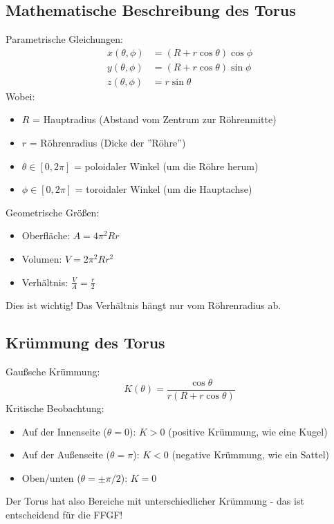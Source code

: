 \documentclass[12pt,a4paper]{article}
\begin{document}
	\subsection{Mathematische Beschreibung des Torus}
	Parametrische Gleichungen:
	\begin{align}
		x(\theta, \phi) &= (R + r \cos \theta) \cos \phi \\
		y(\theta, \phi) &= (R + r \cos \theta) \sin \phi \\
		z(\theta, \phi) &= r \sin \theta
	\end{align}
	Wobei:
	\begin{itemize}
		\item \( R \) = Hauptradius (Abstand vom Zentrum zur Röhrenmitte)
		\item \( r \) = Röhrenradius (Dicke der ''Röhre'')
		\item \( \theta \in [0, 2\pi] \) = poloidaler Winkel (um die Röhre herum)
		\item \( \phi \in [0, 2\pi] \) = toroidaler Winkel (um die Hauptachse)
	\end{itemize}
	
	Geometrische Größen:
	\begin{itemize}
		\item Oberfläche: \( A = 4\pi^2 R r \)
		\item Volumen: \( V = 2\pi^2 R r^2 \)
		\item Verhältnis: \( \frac{V}{A} = \frac{r}{2} \)
	\end{itemize}
	Dies ist wichtig! Das Verhältnis hängt nur vom Röhrenradius ab.
	
	\subsection{Krümmung des Torus}
	Gaußsche Krümmung:
	\[
	K(\theta) = \frac{\cos \theta}{r(R + r \cos \theta)}
	\]
	Kritische Beobachtung:
	\begin{itemize}
		\item Auf der Innenseite (\( \theta = 0 \)): \( K > 0 \) (positive Krümmung, wie eine Kugel)
		\item Auf der Außenseite (\( \theta = \pi \)): \( K < 0 \) (negative Krümmung, wie ein Sattel)
		\item Oben/unten (\( \theta = \pm\pi/2 \)): \( K = 0 \)
	\end{itemize}
	Der Torus hat also Bereiche mit unterschiedlicher Krümmung - das ist entscheidend für die FFGF!
	
\end{document}

